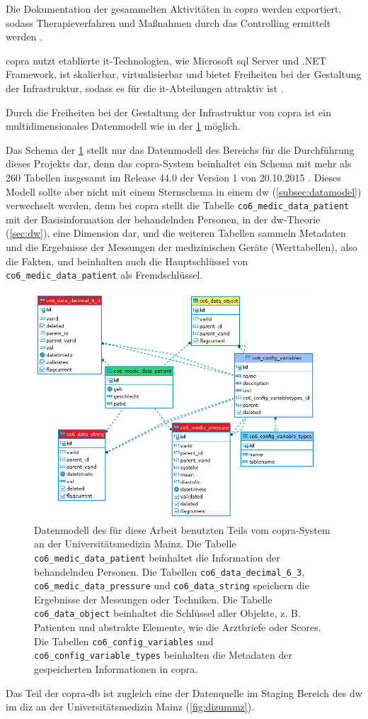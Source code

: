 Die Dokumentation der gesammelten Aktivitäten in \ac{copra} werden exportiert, sodass Therapieverfahren und Maßnahmen durch das Controlling ermittelt werden \cite{copra}.

\ac{copra} nutzt etablierte \ac{it}-Technologien, wie Microsoft \acs{sql} Server und .NET Framework, ist skalierbar, virtualisierbar und bietet Freiheiten bei der Gestaltung der Infrastruktur, sodass es für die \ac{it}-Abteilungen attraktiv ist \cite{copra}.

Durch die Freiheiten bei der Gestaltung der Infrastruktur von \ac{copra} ist ein multidimensionales Datenmodell wie in der \ref{fig:copraschema} möglich. 

Das Schema der \ref{fig:copraschema} stellt nur das Datenmodell des Bereichs für die Durchführung dieses Projekts dar, denn das \ac{copra}-System beinhaltet ein Schema mit mehr als 260 Tabellen insgesamt im Release 44.0 der Version 1 von 20.10.2015 \cite{copradoc}. Dieses Modell sollte aber nicht mit einem Sternschema in einem \ac{dw} (\ref{subsec:datamodel}) verwechselt werden, denn bei \ac{copra} stellt die Tabelle \texttt{co6\_medic\_data\_patient} mit der Basisinformation der behandelnden Personen, in der \ac{dw}-Theorie (\ref{sec:dw}), eine Dimension dar, und die weiteren Tabellen sammeln Metadaten und die Ergebnisse der Messungen der medizinischen Geräte (Werttabellen), also die Fakten, und beinhalten auch die Hauptschlüssel von \texttt{co6\_medic\_data\_patient} als Fremdschlüssel.

\clearpage

\begin{figure}[ht]
	\centering
	\includegraphics[height=8.5cm]{figures/copra_data_model_data}
	\caption[Datenmodell von \acs{copra}]{Datenmodell des für diese Arbeit benutzten Teils vom \ac{copra}-System an der Universitätsmedizin Mainz. Die Tabelle \texttt{co6\_medic\_data\_patient} beinhaltet die Information der behandelnden Personen. Die Tabellen \texttt{co6\_data\_decimal\_6\_3}, \texttt{co6\_medic\_data\_pressure} und \texttt{co6\_data\_string} speichern die Ergebnisse der Messungen oder Techniken. Die Tabelle \texttt{co6\_data\_object} beinhaltet die Schlüssel aller Objekte, z. B. Patienten und abstrakte Elemente, wie die Arztbriefe oder Scores.
	Die Tabellen \texttt{co6\_config\_variables} und \texttt{co6\_config\_variable\_types} beinhalten die Metadaten der gespeicherten Informationen in \ac{copra}.}
	\label{fig:copraschema}
\end{figure}

Das Teil der \ac{copra}-\ac{db} ist zugleich eine der Datenquelle im Staging Bereich des \ac{dw}  im \ac{diz} an der Universitätsmedizin Mainz (\ref{fig:dizummz}).